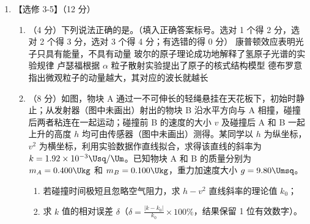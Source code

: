 \documentclass[\gkver]{gaokaozhenti}
\begin{document}
\begin{enumerate}
{

联立以上各式并利用题给条件得 $OE=\frac{\sqrt{2}}{2}R$⑥。
}

\item
【选修 3-5】（12 分）
\begin{enumerate}
	\item
	（4 分）下列说法正确的是。（填入正确答案标号。选对 1 个得 2 分，选对 2 个得 3 分，选对 3 个得 4 分；有选错的得 0 分）
	{康普顿效应表明光子只具有能量，不具有动量}
	{玻尔的原子理论成功地解释了氢原子光谱的实验规律}
	{卢瑟福根据 $\alpha$ 粒子散射实验提出了原子的核式结构模型}
	{德布罗意指出微观粒子的动量越大，其对应的波长就越长}
	\item
	（8 分）如图，物块 A 通过一不可伸长的轻绳悬挂在天花板下，初始时静止；从发射器（图中未画出）射出的物块 B 沿水平方向与 A 相撞，碰撞后两者粘连在一起运动；碰撞前 B 的速度的大小 $v$ 及碰撞后 A 和 B 一起上升的高度 $h$ 均可由传感器（图中未画出）测得。某同学以 $h$ 为纵坐标，$v^{2}$ 为横坐标，利用实验数据作直线拟合，求得该直线的斜率为 $k=1.92\times10^{-3}\Usq/\Um$。已知物块 A 和 B 的质量分别为 $m_{A}=0.400\Ukg$ 和 $m_{B}=0.100\Ukg$，重力加速度大小 $g=9.80\Umsq$。
	\begin{enumerate}[label=(\roman*)]
		\item
		若碰撞时间极短且忽略空气阻力，求 $h-v^{2}$ 直线斜率的理论值 $k_{0}$；
		\item
		求 $k$ 值的相对误差 $\delta$（$\delta=\frac{\left|k-k_{0}\right|}{k_{0}}\times100\%$，结果保留 1 位有效数字）。
	\end{enumerate}
	\onepicture[align=right, h=3.62cm]{}
\end{enumerate}

\end{enumerate}
\end{document}

